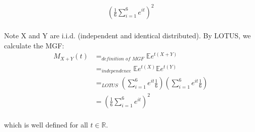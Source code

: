 
\setcounter{theorem}{12}
\begin{exercise} [BH.6.13]
\begin{solution}
    \begin{align*}
		\left(\frac{1}{6}\sum_{i=1}^{6} e^{it} \right)^2
	\end{align*}~\\
	Note X and Y are i.i.d. (independent and identical distributed). By LOTUS, we calculate the MGF:
	\begin{align*}
		M_{X+Y}(t) &=_{\textit{definition of MGF}} \mathbb{E}e^{t(X+Y)} \\&=_{\textit{independence}} \mathbb{E}e^{t(X)}\mathbb{E}e^{t(Y)} \\&=_{\textit{LOTUS}} 	\left(\sum_{i=1}^{6} e^{it} \frac{1}{6}\right)	\left( \sum_{i=1}^{6} e^{it} \frac{1}{6}\right)  \\
		&=  	\left(\frac{1}{6}\sum_{i=1}^{6} e^{it} \right)^2
	\end{align*}~\\
	which is well defined for all $t\in \mathbb{R}$. 
\end{solution}
\end{exercise}

